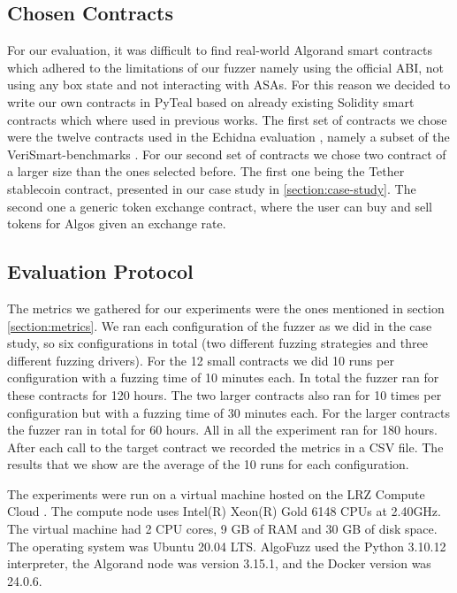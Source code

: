 \subsection*{Chosen Contracts}
For our evaluation, it was difficult to find real-world Algorand smart contracts which adhered to the limitations of our fuzzer namely using the official \ac{ABI}, not using any box state and not interacting with \acp{ASA}.
For this reason we decided to write our own contracts in PyTeal based on already existing Solidity smart contracts which where used in previous works.
The first set of contracts we chose were the twelve contracts used in the Echidna evaluation \cite{grieco_echidna_2020}, namely a subset of the VeriSmart-benchmarks \cite{noauthor_kuplverismart-benchmarks_nodate}.
For our second set of contracts we chose two contract of a larger size than the ones selected before.
The first one being the Tether stablecoin contract, presented in our case study in \ref{section:case-study}.
The second one a generic token exchange contract, where the user can buy and sell tokens for Algos given an exchange rate.

\subsection*{Evaluation Protocol}
The metrics we gathered for our experiments were the ones mentioned in section \ref{section:metrics}.
We ran each configuration of the fuzzer as we did in the case study, so six configurations in total (two different fuzzing strategies and three different fuzzing drivers).
For the 12 small contracts we did 10 runs per configuration with a fuzzing time of 10 minutes each.
In total the fuzzer ran for these contracts for 120 hours.
The two larger contracts also ran for 10 times per configuration but with a fuzzing time of 30 minutes each.
For the larger contracts the fuzzer ran in total for 60 hours.
All in all the experiment ran for 180 hours. After each call to the target contract we recorded the metrics in a \acs{CSV} file. The results that we show are the average of the 10 runs for each configuration.

The experiments were run on a virtual machine hosted on the LRZ Compute Cloud \cite{noauthor_lrz_nodate}.
The compute node uses Intel(R) Xeon(R) Gold 6148 CPUs at 2.40GHz.
The virtual machine had 2 CPU cores, 9 GB of RAM and 30 GB of disk space.
The operating system was Ubuntu 20.04 LTS.
AlgoFuzz used the Python 3.10.12 interpreter, the Algorand node was version 3.15.1, and the Docker version was 24.0.6.

